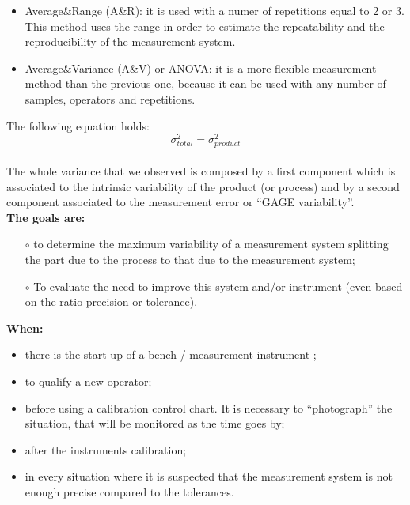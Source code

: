 
\begin{frame}
\vspace*{1cm}
\begin{itemize}
 \item Average\&Range (A\&R): it is used with a numer of repetitions equal to 2 or 3. This method uses the range in order to estimate the repeatability and the reproducibility of the measurement system.
\vspace*{.6cm}
 \item Average\&Variance (A\&V) or ANOVA: it is a more flexible measurement method than the previous one, because it can be used with any number of samples, operators and repetitions.
\end{itemize}
\end{frame}




\begin{frame}
\vspace*{.25cm}
The following equation holds:
$$\sigma^{2}_{total}=\sigma^{2}_{product}$$\\
\vspace*{.3cm}
The whole variance that we observed is composed by a first component which is associated to the intrinsic variability of the product (or process) and by a second component associated to the measurement error or ``GAGE variability''.\\
\vspace*{.25cm}
\textbf{The goals are:}
\begin{itemize}
 \item[$\circ$] to determine the maximum variability of a measurement system splitting the part due to the process to that due to the measurement system;
 \item[$\circ$] To evaluate the need to improve this system and/or instrument (even based on the ratio precision or tolerance).
\end{itemize}

\end{frame}

\begin{frame}
\vspace*{.25cm}
\textbf{When:}
\begin{itemize}
 \item there is the start-up of a bench / measurement instrument ;
 \item to qualify a new operator;
 \item before using a calibration control chart. It is necessary to ``photograph'' the situation, that will be monitored as the time goes by;
 \item after the instruments calibration;
 \item in every situation where it is suspected that the measurement system is not enough precise compared to the tolerances.
\end{itemize}
\end{frame}

